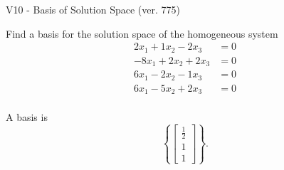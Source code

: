 \begin{exercise}
  \begin{exerciseTitle}V10 - Basis of Solution Space (ver. 775)\end{exerciseTitle}
  \begin{exerciseStatement}
    Find a basis for the solution space of the homogeneous system 
\begin{align*}
 2 x_ 1 + 1 x_ 2 -2 x_ 3 &= 0  \\ 
  -8 x_ 1 + 2 x_ 2 + 2 x_ 3 &= 0  \\ 
  6 x_ 1 -2 x_ 2 -1 x_ 3 &= 0  \\ 
  6 x_ 1 -5 x_ 2 + 2 x_ 3 &= 0  \\ 
 \end{align*}


 
  \end{exerciseStatement}

  \begin{exerciseAnswer}
   A basis is   
\[\left\{\left[\begin{array}{c}
\frac{1}{2} \\
1 \\
1
\end{array}\right]\right\}.\]

  


  \end{exerciseAnswer}
\end{exercise}